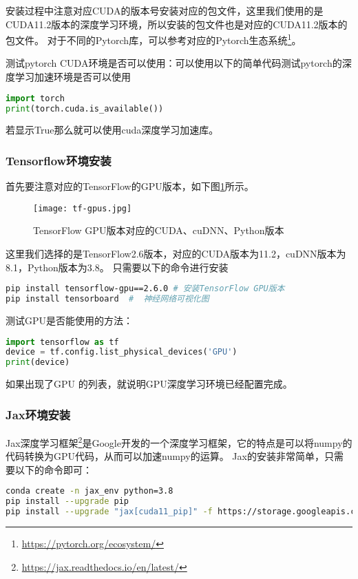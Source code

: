 \documentclass[lang=cn,a4paper,newtx]{elegantpaper}
\begin{document}
安装过程中注意对应CUDA的版本号安装对应的包文件，这里我们使用的是CUDA11.2版本的深度学习环境，所以安装的包文件也是对应的CUDA11.2版本的包文件。
对于不同的Pytorch库，可以参考对应的Pytorch生态系统\footnote{\url{https://pytorch.org/ecosystem/}}。

测试pytorch CUDA环境是否可以使用：可以使用以下的简单代码测试pytorch的深度学习加速环境是否可以使用
\begin{lstlisting}[language=python]
import torch
print(torch.cuda.is_available())
\end{lstlisting}
若显示True那么就可以使用cuda深度学习加速库。

\subsubsection{Tensorflow环境安装}
首先要注意对应的TensorFlow的GPU版本，如下图\ref{fig:tf-gpu}所示。
\begin{figure}[hbpt]
  \centering
  \texttt{[image: tf-gpus.jpg]}
  \caption{TensorFlow GPU版本对应的CUDA、cuDNN、Python版本}
  \label{fig:tf-gpu}
\end{figure}

这里我们选择的是TensorFlow2.6版本，对应的CUDA版本为11.2，cuDNN版本为8.1，Python版本为3.8。
只需要以下的命令进行安装
\begin{lstlisting}[language=bash]
pip install tensorflow-gpu==2.6.0 # 安装TensorFlow GPU版本
pip install tensorboard  #  神经网络可视化图
\end{lstlisting}

测试GPU是否能使用的方法：
\begin{lstlisting}[language=python]
import tensorflow as tf
device = tf.config.list_physical_devices('GPU')
print(device)
\end{lstlisting}

如果出现了GPU 的列表，就说明GPU深度学习环境已经配置完成。

\newpage

\subsubsection{Jax环境安装}
Jax深度学习框架\footnote{\url{https://jax.readthedocs.io/en/latest/}}是Google开发的一个深度学习框架，它的特点是可以将numpy的代码转换为GPU代码，从而可以加速numpy的运算。
Jax的安装非常简单，只需要以下的命令即可：
\begin{lstlisting}[language=bash]
conda create -n jax_env python=3.8
pip install --upgrade pip
pip install --upgrade "jax[cuda11_pip]" -f https://storage.googleapis.com/jax-releases/jax_cuda_releases.html
\end{lstlisting}
\end{document}
